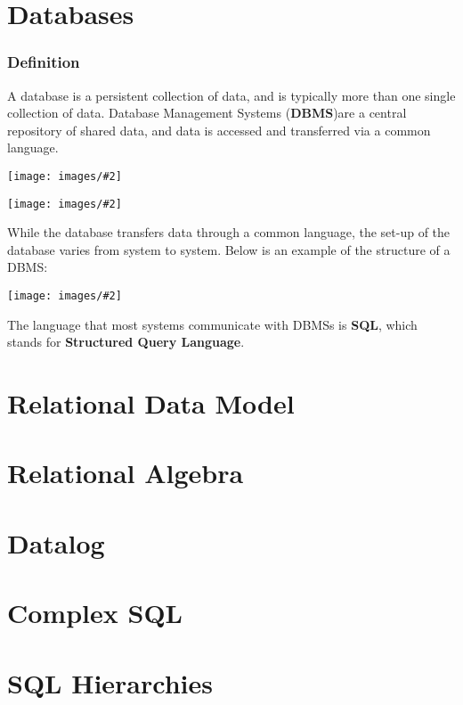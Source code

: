 \documentclass[12pt, letterpaper]{report}
\newcommand{\loadfigure}[2]{\texttt{[image: images/\#2]}}
\newcommand{\captionsource}[2]{
	\centering
	\caption[{#1}]{
	#1
	\\\hspace{\linewidth}
	\normalfont\scriptsize \textbf{Source:} #2}
}
\newcommand{\listfigure}[4]{
\begin{dbfigure}[H]
	\centering
	\loadfigure{#1}{#2}
	\captionsource{#3}{#4}
\end{dbfigure}
}
\begin{document}
\part{Databases}

\section{Definition}

A database is a persistent collection of data, and is typically more than one single collection of data. Database Management Systems (\textbf{DBMS})are a central repository of shared data, and data is accessed and transferred via a common language.

\listfigure{0.35}{dbmodel_1.png}{Shared Information Model}{Bryn Jefferies, USyd INFO2820}

\listfigure{0.35}{dbmodel_2.png}{Relational Database Model}{Bryn Jefferies, USyd INFO2820}

While the database transfers data through a common language, the set-up of the database varies from system to system. Below is an example of the structure of a DBMS:

\listfigure{0.45}{dbmodel_3.png}{DBMS Structure}{Bryn Jefferies, USyd INFO2820}

The language that most systems communicate with DBMSs is \textbf{SQL}, which stands for \textbf{Structured Query Language}. 

\part{Relational Data Model}

\part{Relational Algebra}

\part{Datalog}

\part{Complex SQL}

\part{SQL Hierarchies}
\end{document}
